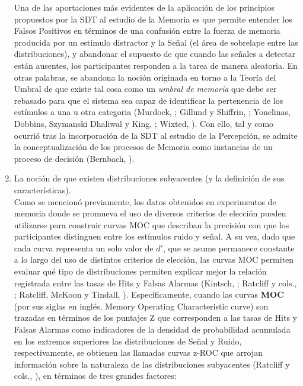 \begin{enumerate}
Una de las aportaciones más evidentes de la aplicación de los principios propuestos por la SDT al estudio de la Memoria es que permite entender los Falsos Positivos en términos de una confusión entre la fuerza de memoria producida por un estímulo distractor y la Señal (el área de sobrelape entre las distribuciones), y abandonar el supuesto de que cuando las señales a detectar están ausentes, los participantes responden a la tarea de manera aleatoria. En otras palabras, se abandona la noción originada en torno a la Teoría del Umbral de que existe tal cosa como un \textit{umbral de memoria} que debe ser rebasado para que el sistema sea capaz de identificar la pertenencia de los estímulos a una u otra categoria (Murdock, \citeyear{Murdock1982}; Gillund y Shiffrin, \citeyear{Gillund1984}; Yonelinas, Dobbins, Szymanski Dhaliwal y King, \citeyear{Yonelinas1996}; Wixted, \citeyear{Wixted2007}). Con ello, tal y como ocurrió tras la incorporación de la SDT al estudio de la Percepción, se admite la conceptualización de los procesos de Memoria como instancias de un proceso de decisión (Bernbach, \citeyear{Bernbach1967}).\\
 
\item La noción de que existen distribuciones subyacentes (y la definición de sus características).\\

Como se mencionó previamente, los datos obtenidos en experimentos de memoria donde se promueva el uso de diversos criterios de elección pueden utilizarse para construir curvas MOC que describan la precisión con que los participantes distinguen entre los estímulos ruido y señal. A su vez, dado que cada curva representa un solo valor de $d'$, que se asume permanece constante a lo largo del uso de distintos criterios de elección, las curvas MOC permiten evaluar qué tipo de distribuciones permiten explicar mejor la relación registrada entre las tasas de Hits y Falsas Alarmas (Kintsch, \citeyear{Kintsch1967}; Ratcliff y cols., \citeyear{Ratcliff1992}; Ratcliff, McKoon y Tindall, \citeyear{Ratcliff1994}). Específicamente, cuando las curvas \textbf{MOC} (por sus siglas en inglés, Memory Operating Characteristic curve) son trazadas en términos de los puntajes Z que corresponden a las tasas de Hits y Falsas Alarmas como indicadores de la densidad de probabilidad acumulada en los extremos superiores las distribuciones de Señal y Ruido, respectivamente, se obtienen las llamadas curvas z-ROC que arrojan información sobre la naturaleza de las distribuciones subyacentes (Ratcliff y cols., \citeyear{Ratcliff1992}), en términos de tres grandes factores:\\


\end{enumerate}
